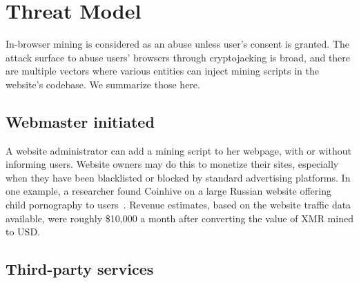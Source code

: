 
%
%
%
%
%
%

\section{Threat Model}
In-browser mining is considered as an abuse unless user's consent is granted. The attack surface to abuse users' browsers through cryptojacking is broad, and there are multiple vectors where various entities can inject mining scripts in the website's codebase. We summarize those here. 

\subsection{Webmaster initiated} 

A website administrator can add a mining script to her webpage, with or without informing users. Website owners may do this to monetize their sites, especially when they have been blacklisted or blocked by standard advertising platforms. In one example, a researcher found Coinhive on a large Russian website offering child pornography to users~\cite{coinhiveonchildporn}. Revenue estimates, based on the website traffic data available, were roughly \$10,000 a month after converting the value of XMR mined to USD.

\subsection{Third-party services} 

